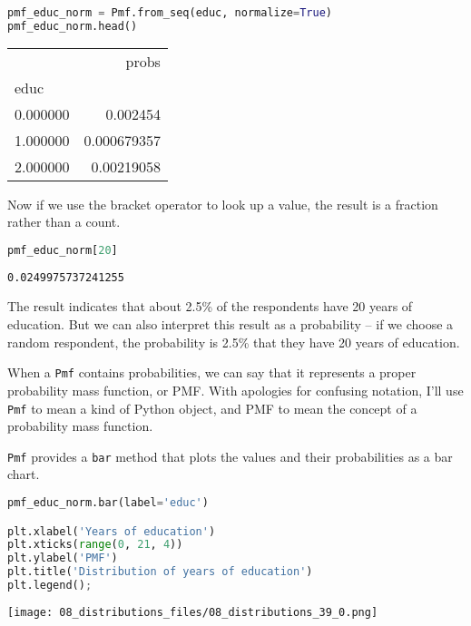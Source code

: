 \begin{lstlisting}[language=Python,style=source]
pmf_educ_norm = Pmf.from_seq(educ, normalize=True)
pmf_educ_norm.head()
\end{lstlisting}

\begin{tabular}{lr}
\toprule
 & probs \\
educ &  \\
\midrule
0.000000 & 0.002454 \\
1.000000 & 0.000679357 \\
2.000000 & 0.00219058 \\
\bottomrule
\end{tabular}

Now if we use the bracket operator to look up a value, the result is a
fraction rather than a count.

\begin{lstlisting}[language=Python,style=source]
pmf_educ_norm[20]
\end{lstlisting}

\begin{lstlisting}[style=output]
0.0249975737241255
\end{lstlisting}

The result indicates that about 2.5\% of the respondents have 20 years
of education. But we can also interpret this result as a probability --
if we choose a random respondent, the probability is 2.5\% that they
have 20 years of education.

When a \passthrough{\lstinline!Pmf!} contains probabilities, we can say
that it represents a proper probability mass function, or PMF. With
apologies for confusing notation, I'll use \passthrough{\lstinline!Pmf!}
to mean a kind of Python object, and PMF to mean the concept of a
probability mass function.

\passthrough{\lstinline!Pmf!} provides a \passthrough{\lstinline!bar!}
method that plots the values and their probabilities as a bar chart.

\begin{lstlisting}[language=Python,style=source]
pmf_educ_norm.bar(label='educ')

plt.xlabel('Years of education')
plt.xticks(range(0, 21, 4))
plt.ylabel('PMF')
plt.title('Distribution of years of education')
plt.legend();
\end{lstlisting}

\begin{center}
\texttt{[image: 08\_distributions\_files/08\_distributions\_39\_0.png]}
\end{center}

